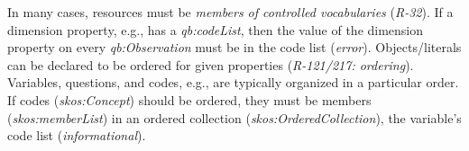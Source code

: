 \documentclass{llncs}
\begin{document}
In many cases, resources must be \emph{members of controlled vocabularies} (\emph{R-32}).
If a dimension property, e.g., has a \emph{qb:codeList},
then the value of the dimension property on every \emph{qb:Observation} must be in the code list (\emph{error}).
Objects/literals can be declared to be ordered for given properties (\emph{R-121/217: ordering}).
Variables, questions, and codes, e.g., are typically organized in a particular order. 
If codes (\emph{skos:Concept}) should be ordered, they must be members (\emph{skos:memberList}) in an ordered collection (\emph{skos:OrderedCollection}), the variable's code list (\emph{informational}).
\end{document}

